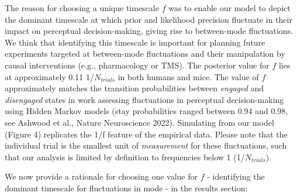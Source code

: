 \documentclass[
]{article}
\begin{document}
The reason for choosing a unique timescale \(f\) was to enable our model
to depict the dominant timescale at which prior and likelihood precision
fluctuate in their impact on perceptual decision-making, giving rise to
between-mode fluctuations. We think that identifying this timescale is
important for planning future experiments targeted at between-mode
fluctuations and their manipulation by causal interventions (e.g.,
pharmacology or TMS). The posterior value for \(f\) lies at
approximately 0.11 1/\(N_{trials}\) in both humans and mice. The value
of \(f\) approximately matches the transition probabilities between
\emph{engaged} and \emph{disengaged} states in work assessing
fluctuations in perceptual decision-making using Hidden Markov models
(stay probabilities ranged between 0.94 and 0.98, see Ashwood et al.,
Nature Neuroscience 2022). Simulating from our model (Figure 4)
replicates the 1/f feature of the empirical data. Please note that the
individual trial is the smallest unit of \emph{measurement} for these
fluctuations, such that our analysis is limited by definition to
frequencies below 1 (1/\(N_{trials}\)).

We now provide a rationale for choosing one value for \(f\) -
identifying the dominant timescale for fluctuations in mode - in the
results section:
\end{document}
